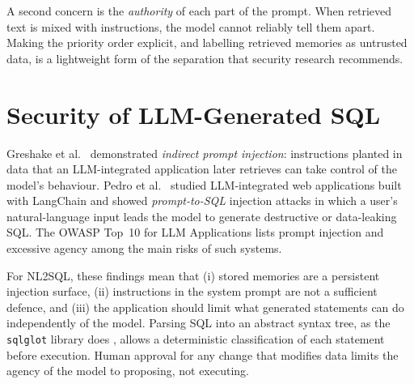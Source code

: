 A second concern is the \textit{authority} of each part of the prompt. When retrieved text
is mixed with instructions, the model cannot reliably tell them apart. Making the priority
order explicit, and labelling retrieved memories as untrusted data, is a lightweight form of
the separation that security research recommends.

\section{Security of LLM-Generated SQL}
Greshake et al.\ \cite{greshake2023indirect} demonstrated \textit{indirect prompt
injection}: instructions planted in data that an LLM-integrated application later
retrieves can take control of the model's behaviour. Pedro et al.\ \cite{pedro2023prompt}
studied LLM-integrated web applications built with LangChain and showed
\textit{prompt-to-SQL} injection attacks in which a user's natural-language input leads the
model to generate destructive or data-leaking SQL. The OWASP Top~10 for LLM Applications
\cite{owasp2023llm} lists prompt injection and excessive agency among the main risks of
such systems.

For NL2SQL, these findings mean that (i) stored memories are a persistent injection
surface, (ii) instructions in the system prompt are not a sufficient defence, and (iii) the
application should limit what generated statements can do independently of the model.
Parsing SQL into an abstract syntax tree, as the \texttt{sqlglot} library does
\cite{sqlglotdocs}, allows a deterministic classification of each statement before
execution. Human approval for any change that modifies data limits the agency of the
model to proposing, not executing.

